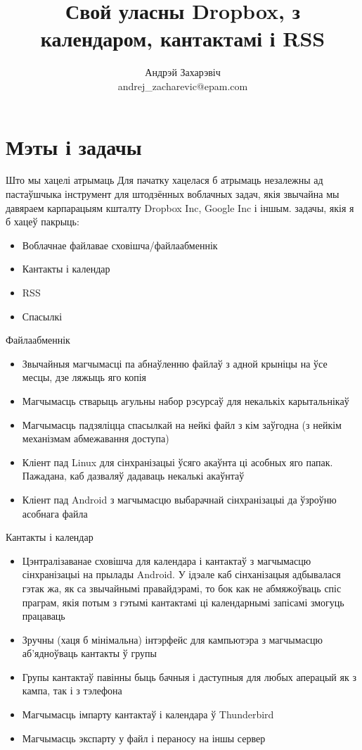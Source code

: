 \documentclass[ignorenonframetext,hyperref={pdftex,unicode}]{beamer}
\title{Свой уласны Dropbox, з календаром, кантактамі і RSS}
\author[Андрэй Захарэвіч]{Андрэй Захарэвіч\\ andrej\_zacharevic@epam.com}
\begin{document}
\frame{\titlepage} 


\section{Мэты і задачы} 

\begin{frame}{Што мы хацелі атрымаць} 
	Для пачатку хацелася б атрымаць незалежны ад пастаўшчыка інструмент для штодзённых воблачных задач, якія звычайна мы давяраем карпарацыям кшталту Dropbox Inc, Google Inc і іншым.  задачы, якія я б хацеў пакрыць:
	\begin{itemize}
		\item Воблачнае файлавае сховішча/файлаабменнік
		\item Кантакты і календар
		\item RSS
		\item Спасылкі
	\end{itemize}
\end{frame}

\begin{frame}{Файлаабменнік}
	\begin{itemize}
		\item Звычайныя магчымасці па абнаўленню файлаў з адной крыніцы на ўсе месцы, дзе ляжыць яго копія
		\item Магчымасць стварыць агульны набор рэсурсаў для некалькіх карытальнікаў
		\item Магчымасць падзяліцца спасылкай на нейкі файл з кім заўгодна (з нейкім механізмам абмежавання доступа)
		\item Кліент пад Linux для сінхранізацыі ўсяго акаўнта ці асобных яго папак. Пажадана, каб дазваляў дадаваць некалькі акаўнтаў
		\item Кліент пад Android з магчымасцю выбарачнай сінхранізацыі да ўзроўню асобнага файла
	\end{itemize}
\end{frame}

\begin{frame}{Кантакты і календар}
	\begin{itemize}
		\item Цэнтралізаванае сховішча для календара і кантактаў з магчымасцю сінхранізацыі на прылады Android. У ідэале каб сінханізацыя адбывалася гэтак жа, як са звычайнымі правайдэрамі, то бок как не абмяжоўваць спіс праграм, якія потым з гэтымі кантактамі ці календарнымі запісамі змогуць працаваць
		\item Зручны (хаця б мінімальна) інтэрфейс для кампьютэра з магчымасцю аб’ядноўваць кантакты ў групы
		\item Групы кантактаў павінны быць бачныя і даступныя для любых аперацый як з кампа, так і з тэлефона
		\item Магчымасць імпарту кантактаў і календара ў Thunderbird
		\item Магчымасць экспарту у файл і пераносу на іншы сервер
	\end{itemize}
\end{frame}
\end{document}
